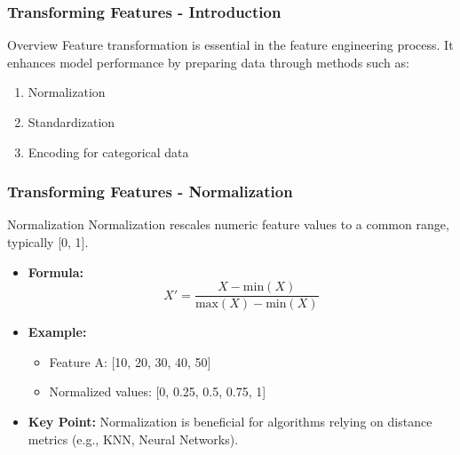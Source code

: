 \documentclass[aspectratio=169]{beamer}
\begin{document}
\begin{frame}[fragile]
    \frametitle{Transforming Features - Introduction}
    \begin{block}{Overview}
        Feature transformation is essential in the feature engineering process. It enhances model performance by preparing data through methods such as:
        \begin{enumerate}
            \item Normalization
            \item Standardization
            \item Encoding for categorical data
        \end{enumerate}
    \end{block}
\end{frame}

\begin{frame}[fragile]
    \frametitle{Transforming Features - Normalization}
    \begin{block}{Normalization}
        Normalization rescales numeric feature values to a common range, typically [0, 1].
        \begin{itemize}
            \item \textbf{Formula:} 
            \[
            X' = \frac{X - \text{min}(X)}{\text{max}(X) - \text{min}(X)}
            \]
            \item \textbf{Example:} 
                \begin{itemize}
                    \item Feature A: [10, 20, 30, 40, 50]
                    \item Normalized values: [0, 0.25, 0.5, 0.75, 1]
                \end{itemize}
            \item \textbf{Key Point:} 
                Normalization is beneficial for algorithms relying on distance metrics (e.g., KNN, Neural Networks).
        \end{itemize}
    \end{block}
\end{frame}
\end{document}
